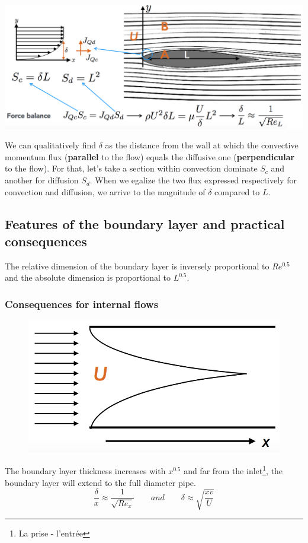 	\begin{center}
	\includegraphics[scale=0.4]{ch1/12}
	\end{center}
	We can qualitatively find $\delta$ as the distance from the wall at which the convective momentum flux (\textbf{parallel} to the flow) equals the diffusive one (\textbf{perpendicular} to the flow). For that, let's take a section within convection dominate $S_c$ and another for diffusion $S_d$. When we egalize the two flux expressed respectively for convection and diffusion, we arrive to the magnitude of $\delta$ compared to $L$.
	
\subsection{Features of the boundary layer and practical consequences}
	The relative dimension of the boundary layer is inversely proportional to $Re^{0.5}$ and the absolute dimension is proportional to $L^{0.5}$.

\subsubsection{Consequences for internal flows}
	\begin{figure}
	\vspace{-5mm}
	\includegraphics[scale=0.3]{ch1/13}
	\end{figure}
	The boundary layer thickness increases with $x^{0.5}$ and far from the inlet\footnote{La prise - l'entrée}, the boundary layer will extend to the full diameter pipe. 
	\begin{equation}
		\frac{\delta}{x} \approx \frac{1}{\sqrt{Re_x}} \qquad and \qquad \delta \approx \sqrt{\frac{xv}{U}}
	\end{equation}
	
